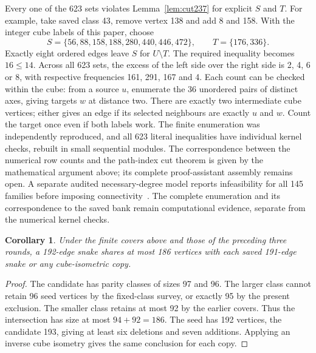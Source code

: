 \documentclass[11pt,a4paper]{article}
\newtheorem{corollary}[theorem]{Corollary}
\theoremstyle{definition}
\theoremstyle{remark}
\begin{document}
Every one of the 623 sets violates Lemma~\ref{lem:cut237} for explicit
$S$ and $T$. For example, take saved class 43, remove vertex 138 and add
8 and 158. With the integer cube labels of this paper, choose
\[
 S=\{56,88,158,188,280,440,446,472\},\qquad T=\{176,336\}.
\]
Exactly eight ordered edges leave $S$ for $U\setminus T$. The required
inequality becomes $16\le14$. Across all 623 sets, the excess of the
left side over the right side is 2, 4, 6 or 8, with respective
frequencies 161, 291, 167 and 4. Each count can be checked within the
cube: from a source $u$, enumerate the 36 unordered pairs of distinct
axes, giving targets $w$ at distance two. There are exactly two
intermediate cube vertices; either gives an edge if its selected
neighbours are exactly $u$ and $w$. Count the target once even if both
labels work. The finite enumeration was independently reproduced, and
all 623 literal inequalities have individual kernel checks, rebuilt in
small sequential modules. The correspondence between the numerical row
counts and the path-index cut theorem is given by the mathematical
argument above; its complete proof-assistant assembly remains open.
A separate audited necessary-degree model reports infeasibility for all
145 families before imposing connectivity~\cite{research237}. The
complete enumeration and its correspondence to the saved bank remain
computational evidence, separate from the numerical kernel checks.

\begin{corollary}
Under the finite covers above and those of the preceding three rounds,
a 192-edge snake shares at most 186 vertices with each saved 191-edge
snake or any cube-isometric copy.
\end{corollary}
\begin{proof}
The candidate has parity classes of sizes 97 and 96. The larger class
cannot retain 96 seed vertices by the fixed-class survey, or exactly 95
by the present exclusion. The smaller class retains at most 92 by the
earlier covers. Thus the intersection has size at most $94+92=186$.
The seed has 192 vertices, the candidate 193, giving at least six
deletions and seven additions. Applying an inverse cube isometry gives
the same conclusion for each copy.
\end{proof}
\end{document}
